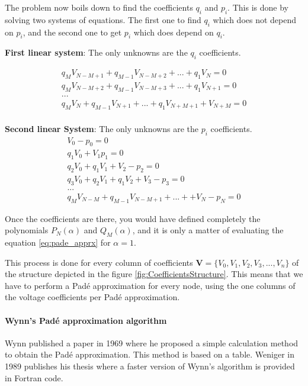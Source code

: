\documentclass[nols,a4paper,twoside,notoc,fleqn]{tufte-book}
\begin{document}
The problem now boils down to find the coefficients $q_i$ and $p_i$. This is done by solving two systems of equations. The first one to find $q_i$ which does not depend on $p_i$, and the second one to get $p_i$ which does depend on $q_i$.

\textbf{First linear system}: The only unknowns are the $q_i$ coefficients.

\begin{equation}
\begin{matrix}
q_M V_{N-M+1} + q_{M-1}V_{N-M+2}+...+q_1V_N = 0\\
q_M V_{N-M+2} + q_{M-1}V_{N-M+3}+...+q_1V_{N+1} = 0\\
...\\
q_M V_{N} + q_{M-1}V_{N+1}+...+q_1V_{N+M+1} + V_{N+M} = 0\\
\end{matrix}
\end{equation}

\textbf{Second linear System}: The only unknowns are the $p_i$ coefficients.
\begin{equation}
\begin{matrix}
V_0 - p_0=0\\
q_1V_0 + V_1  p_1=0\\
q_2V_0 + q_1V_1+V_2-p_2=0\\
q_3V_0 + q_2V_1 + q_1V_2 + V_3 - p_3 = 0\\
...\\
q_MV_{N-M} + q_{M-1}V_{N-M+1} + ... + +V_N - p_N=0
\end{matrix}
\end{equation}

Once the coefficients are there, you would have defined completely the polynomials $P_N(\alpha)$ and $Q_M(\alpha)$, and it is only a matter of evaluating the equation \ref{eq:pade_apprx} for $\alpha=1$.\newline


This process is done for every column of coefficients $\textbf{V}=\{V_0, V_1,V_2,V_3, ...,V_n\}$ of the structure depicted in the figure \ref{fig:CoefficientsStructure}. This means that we have to perform a Pad\'e approximation for every node, using the one columns of the voltage coefficients per Pad\'e approximation.

\paragraph{Wynn's Pad\'e approximation algorithm}

Wynn published a paper in 1969 where he proposed a simple calculation method to obtain the Pad\'e approximation. This method is based on a table. Weniger in 1989 publishes his thesis where a faster version of Wynn's algorithm is provided in Fortran code. 
\end{document}
